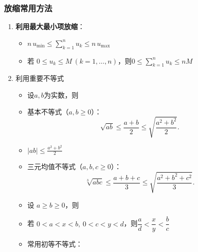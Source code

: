 \documentclass[../book.tex]{subfiles}
\begin{document}
    \subsubsection{放缩常用方法}
    \begin{enumerate}
        \item \textbf{利用最大最小项放缩}：
        \begin{itemize}
            \item $n\,u_{\min}\le \sum\limits_{k=1}^n u_k \le n\,u_{\max}$
            \item 若 $0\le u_k\le M\ (k=1,\dots,n)$，则$0\le \sum\limits_{k=1}^n u_k\le nM$
        \end{itemize}
        \item 利用重要不等式
        \begin{itemize}
            \item 设$a,b$为实数，则
            \item 基本不等式（$a,b\geq0$）：
            \[
                \sqrt{ab}\le \frac{a+b}{2}\le \sqrt{\frac{a^2+b^2}{2}}.
            \]
            \item $|ab| \leq \displaystyle\frac{a^2 + b^2}{2}$
            \item 三元均值不等式（$a,b,c \geq 0$）：
            \[
                \sqrt[3]{abc}\leq \frac{a+b+c}{3} \leq \sqrt{\frac{a^2+b^2+c^2}{3}}.
            \]
            \item 设 $a\ge b\ge0$，则
            \item 若 $0<a<x<b,\ 0<c<y<d$，则$\dfrac{a}{d}<\dfrac{x}{y}<\dfrac{b}{c}$
            \item 常用初等不等式：
\end{itemize}
\end{enumerate}
\end{document}
